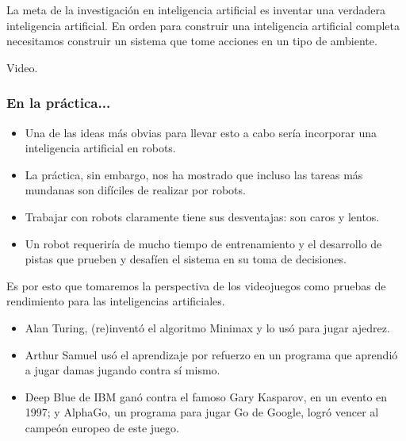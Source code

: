 \documentclass[aspectratio=169]{beamer}
\begin{document}
\begin{frame}
\begin{center}
La meta de la investigación en inteligencia artificial es inventar una
verdadera inteligencia artificial. En orden para construir una inteligencia
artificial completa necesitamos construir un sistema que tome acciones en un
tipo de ambiente.
\end{center}
\end{frame}

\begin{frame}
\begin{center}
Video.
\end{center}
\end{frame}

\begin{frame}
\frametitle{En la práctica...}
\begin{itemize}[<+->]
\item Una de las ideas más obvias para llevar esto a cabo sería incorporar una
  inteligencia artificial en robots.
\item La práctica, sin embargo, nos ha mostrado que incluso las tareas más
  mundanas son difíciles de realizar por robots. 
\item Trabajar con robots claramente tiene sus desventajas: son caros y lentos.
\item Un robot requeriría de mucho tiempo de entrenamiento y el desarrollo de
  pistas que prueben y desafíen el sistema en su toma de decisiones.
\end{itemize}
\end{frame}

\begin{frame}
\begin{center}
Es por esto que tomaremos la perspectiva de los videojuegos como pruebas de
rendimiento para las inteligencias artificiales.
\end{center}
\end{frame}

\begin{frame}
\begin{itemize}[<+->]
\item Alan Turing, (re)inventó el algoritmo Minimax y lo usó para jugar ajedrez.
\item Arthur Samuel usó el aprendizaje por refuerzo en un programa que aprendió a jugar
damas jugando contra sí mismo.
\item Deep Blue de IBM ganó contra el famoso Gary Kasparov, en un evento en
1997; y AlphaGo, un programa para jugar Go de Google, logró vencer al
campeón europeo de este juego.
\end{itemize}
\end{frame}
\end{document}
